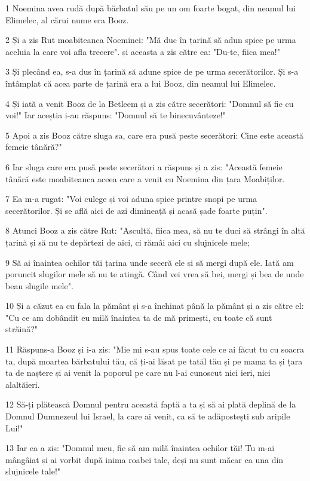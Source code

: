 \par 1 Noemina avea rudă după bărbatul său pe un om foarte bogat, din neamul lui Elimelec, al cărui nume era Booz.
\par 2 Și a zis Rut moabiteanca Noeminei: "Mă duc în țarină să adun spice pe urma aceluia la care voi afla trecere". și aceasta a zis către ea: "Du-te, fiica mea!"
\par 3 Și plecând ea, s-a dus în țarină să adune spice de pe urma secerătorilor. Și s-a întâmplat că acea parte de țarină era a lui Booz, din neamul lui Elimelec.
\par 4 Și iată a venit Booz de la Betleem și a zis către secerători: "Domnul să fie cu voi!" Iar aceștia i-au răspuns: "Domnul să te binecuvânteze!"
\par 5 Apoi a zis Booz către sluga sa, care era pusă peste secerători: Cine este această femeie tânără?"
\par 6 Iar sluga care era pusă peste secerători a răspuns și a zis: "Această femeie tânără este moabiteanca aceea care a venit cu Noemina din țara Moabiților.
\par 7 Ea m-a rugat: "Voi culege și voi aduna spice printre snopi pe urma secerătorilor. Și se află aici de azi dimineață și acasă șade foarte puțin".
\par 8 Atunci Booz a zis către Rut: "Ascultă, fiica mea, să nu te duci să strângi în altă țarină și să nu te depărtezi de aici, ci rămâi aici cu slujnicele mele;
\par 9 Să ai înaintea ochilor tăi țarina unde seceră ele și să mergi după ele. Iată am poruncit slugilor mele să nu te atingă. Când vei vrea să bei, mergi și bea de unde beau slugile mele".
\par 10 Și a căzut ea cu fala la pământ și s-a închinat până la pământ și a zis către el: "Cu ce am dobândit eu milă înaintea ta de mă primești, cu toate că sunt străină?"
\par 11 Răspuns-a Booz și i-a zis: "Mie mi s-au spus toate cele ce ai făcut tu cu soacra ta, după moartea bărbatului tău, că ți-ai lăsat pe tatăl tău și pe mama ta și țara ta de naștere și ai venit la poporul pe care nu l-ai cunoscut nici ieri, nici alaltăieri.
\par 12 Să-ți plătească Domnul pentru această faptă a ta și să ai plată deplină de la Domnul Dumnezeul lui Israel, la care ai venit, ca să te adăpostești sub aripile Lui!"
\par 13 Iar ea a zis: "Domnul meu, fie să am milă înaintea ochilor tăi! Tu m-ai mângâiat și ai vorbit după inima roabei tale, deși nu sunt măcar ca una din slujnicele tale!"
